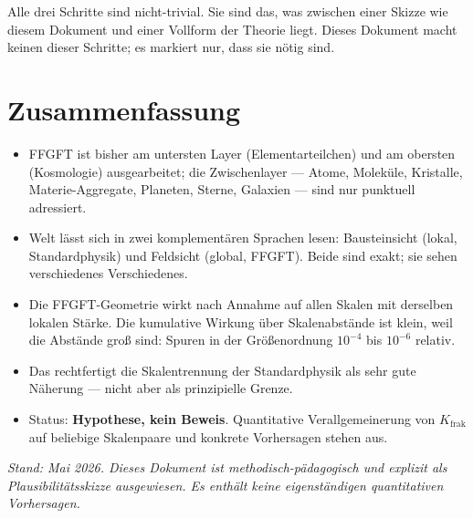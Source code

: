 Alle drei Schritte sind nicht-trivial. Sie sind das, was zwischen
einer Skizze wie diesem Dokument und einer Vollform der Theorie liegt.
Dieses Dokument macht keinen dieser Schritte; es markiert nur, dass
sie nötig sind.

\section*{Zusammenfassung}

\begin{itemize}\setlength\itemsep{2pt}
  \item FFGFT ist bisher am untersten Layer (Elementarteilchen) und
        am obersten (Kosmologie) ausgearbeitet; die Zwischenlayer
        --- Atome, Moleküle, Kristalle, Materie-Aggregate, Planeten,
        Sterne, Galaxien --- sind nur punktuell adressiert.
  \item Welt lässt sich in zwei komplementären Sprachen lesen:
        Bausteinsicht (lokal, Standardphysik) und Feldsicht (global,
        FFGFT). Beide sind exakt; sie sehen verschiedenes
        Verschiedenes.
  \item Die FFGFT-Geometrie wirkt nach Annahme auf allen Skalen mit
        derselben lokalen Stärke. Die kumulative Wirkung über
        Skalenabstände ist klein, weil die Abstände groß sind: Spuren
        in der Größenordnung $10^{-4}$ bis $10^{-6}$ relativ.
  \item Das rechtfertigt die Skalentrennung der Standardphysik als
        sehr gute Näherung --- nicht aber als prinzipielle Grenze.
  \item Status: \textbf{Hypothese, kein Beweis}. Quantitative
        Verallgemeinerung von $K_{\mathrm{frak}}$ auf beliebige
        Skalenpaare und konkrete Vorhersagen stehen aus.
\end{itemize}

\medskip
\noindent\textit{Stand: Mai 2026. Dieses Dokument ist
methodisch-pädagogisch und explizit als Plausibilitätsskizze
ausgewiesen. Es enthält keine eigenständigen quantitativen
Vorhersagen.}
